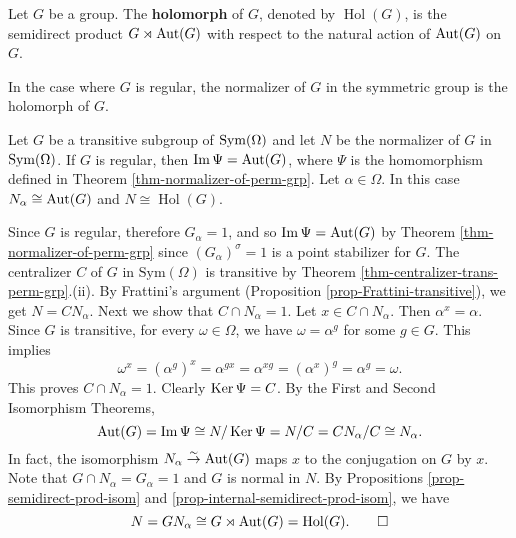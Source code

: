 \begin{definition}
	Let $G$ be a group. The \textbf{holomorph} of $G$, denoted by $\operatorname{Hol} (G)$, is the semidirect product $G \rtimes \operatorname{Aut} (G)$ with respect to the natural action of $\operatorname{Aut} (G)$ on $G$.
\end{definition}
In the case where $G$ is regular,  the normalizer of $G$ in the symmetric group is the holomorph of $G$.
\begin{corollary}
	Let $G$ be a transitive subgroup of $\operatorname{Sym} (\Omega)$ and let $N$ be the normalizer of $G$ in $\operatorname{Sym} (\Omega)$. If $G$ is regular, then $\operatorname{Im}  \Psi = \operatorname{Aut} (G)$, where $\Psi$ is the homomorphism defined in Theorem \ref{thm-normalizer-of-perm-grp}. Let $\alpha\in \Omega$. In this case $N_\alpha \cong \operatorname{Aut} (G)$ and $N\cong\operatorname{Hol}(G)$.
\end{corollary}
\begin{sketch}
	Since $G$ is regular, therefore $G_\alpha = 1$, and so $\operatorname{Im}  \Psi = \operatorname{Aut} (G)$ by Theorem \ref{thm-normalizer-of-perm-grp} since $(G_\alpha)^{\sigma} = 1$ is a point stabilizer for $G$. The centralizer $C$ of $G$ in $\text{Sym}(\Omega)$ is transitive by Theorem \ref{thm-centralizer-trans-perm-grp}.(ii). By Frattini's argument (Proposition \ref{prop-Frattini-transitive}), we get $N = CN_\alpha$. Next we show that $C \cap N_\alpha = 1$. Let $x\in C \cap N_\alpha$. Then $\alpha^x = \alpha$. Since $G$ is transitive, for every $\omega\in\Omega$, we have $\omega = \alpha^g$ for some $g\in G$. This implies 
	\begin{equation*}
		\omega^x = (\alpha^g)^x =\alpha^{gx} = \alpha^{xg} = (\alpha^x)^g = \alpha^g = \omega. 
	\end{equation*}
	This proves $C \cap N_\alpha = 1$. Clearly $\operatorname{Ker}\Psi = C$. By the First and Second Isomorphism Theorems, 
\begin{equation*}
	\operatorname{Aut} (G) =\operatorname{Im}  \Psi \cong N/\operatorname{Ker} \Psi = N/C = CN_\alpha/C \cong N_\alpha.
\end{equation*} In fact, the isomorphism $N_\alpha\stackrel{\sim}{\rightarrow}\operatorname{Aut} (G)$ maps $x$ to the conjugation on $G$ by $x$. Note that $G \cap N_\alpha = G_\alpha = 1$ and $G$ is normal in $N$. By Propositions \ref{prop-semidirect-prod-isom} and \ref{prop-internal-semidirect-prod-isom}, we have 
\begin{equation*}
	N = GN_\alpha \cong G \rtimes \operatorname{Aut} (G) = \operatorname{Hol}(G). \qedhere
\end{equation*}
\end{sketch} 

